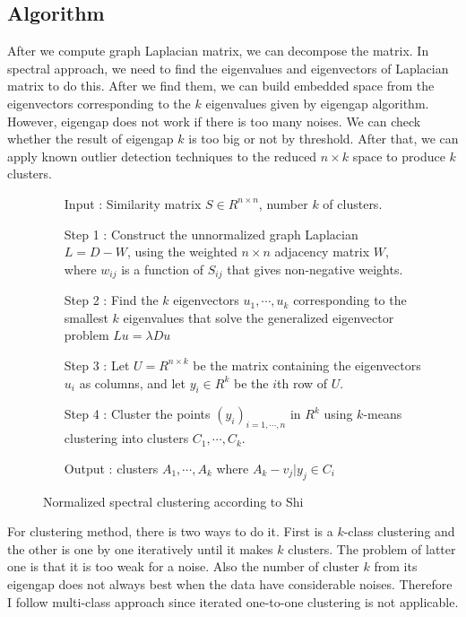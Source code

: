 \subsection{Algorithm}
After we compute graph Laplacian matrix, we can decompose the matrix. 
In spectral approach, we need to find the eigenvalues and eigenvectors of Laplacian matrix to do this. 
After we find them, we can build embedded space from the eigenvectors corresponding to the $k$ eigenvalues given by eigengap algorithm. 
However, eigengap does not work if there is too many noises. 
We can check whether the result of eigengap $k$ is too big or not by threshold.
After that, we can apply known outlier detection techniques \cite{knorr00} to the reduced $n \times k$ space to produce $k$ clusters. 
\begin{figure}[ht]
\begin{mdframed}
\begin{enumerate}
\item[Input] : Similarity matrix $S \in R^{n \times n}$, number $k$ of clusters. \\
\item[Step 1] : Construct the unnormalized graph Laplacian $L = D - W$, using the weighted $n \times n$ adjacency matrix $W$, where $w_{ij}$ is a function of $S_{ij}$ that gives non-negative weights. \\
\item[Step 2] : Find the $k$ eigenvectors $u_1, \cdots, u_k$ corresponding to the smallest $k$ eigenvalues that solve the generalized eigenvector problem $L u = \lambda D u$ \\
\item[Step 3] : Let $U = R^{n \times k}$ be the matrix containing the eigenvectors $u_i$ as columns, and let $y_i \in R^k$ be the $i$th row of $U$.\\
\item[Step 4] : Cluster the points $(y_i)_{i=1,\cdots,n}$ in $R^k$ using $k$-means clustering into clusters $C_1,\cdots,C_k$.\\
\item[Output] : clusters $A_1, \cdots, A_k$ where $A_k - {v_j|y_j \in C_i}$
\end{enumerate}
\end{mdframed}
\caption{Normalized spectral clustering according to Shi}
\end{figure}

For clustering method, there is two ways to do it. 
First is a $k$-class clustering \cite{jianbo03} and the other is one by one iteratively until it makes $k$ clusters. 
The problem of latter one is that it is too weak for a noise. 
Also the number of cluster $k$ from its eigengap does not always best when the data have considerable noises. 
Therefore I follow multi-class approach since iterated one-to-one clustering is not applicable. %

